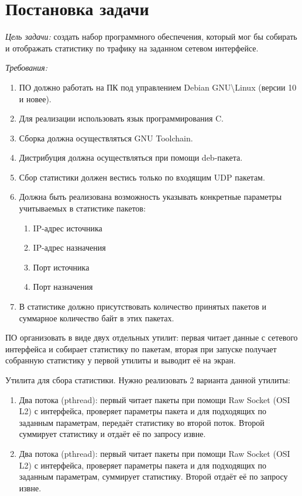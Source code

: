 \section*{Постановка задачи}

\textit{Цель задачи:} создать набор программного обеспечения, который мог бы собирать и отображать статистику по трафику на заданном сетевом интерфейсе.

\linespace

\textit{Требования:}
\begin{enumerate}
    \item ПО должно работать на ПК под управлением Debian GNU\textbackslash Linux (версии 10 и новее).
    \item Для реализации использовать язык программирования C.
    \item Сборка должна осуществляться GNU Toolchain.
    \item Дистрибуция должна осуществляться при помощи deb-пакета.
    \item Сбор статистики должен вестись только по входящим UDP пакетам.
    \item Должна быть реализована возможность указывать конкретные параметры учитываемых в статистике пакетов:
    \begin{enumerate}[wide=\dimexpr\parindent+1.25cm, noitemsep]
        \item IP-адрес источника
        \item IP-адрес назначения
        \item Порт источника
        \item Порт назначения
    \end{enumerate}
    \item В статистике должно присутствовать количество принятых пакетов и суммарное количество байт в этих пакетах.
\end{enumerate}

\linespace

ПО организовать в виде двух отдельных утилит: первая читает данные с сетевого интерфейса и собирает статистику по пакетам, вторая при запуске получает собранную статистику у первой утилиты и выводит её на экран.

\linespace

Утилита для сбора статистики. Нужно реализовать 2 варианта данной утилиты:
\begin{enumerate}
    \item Два потока (pthread): первый читает пакеты при помощи Raw Socket (OSI L2) с интерфейса, проверяет параметры пакета и для подходящих по заданным параметрам, передаёт статистику во второй поток. Второй суммирует статистику и отдаёт её по запросу извне.
    \item Два потока (pthread): первый читает пакеты при помощи Raw Socket (OSI L2) с интерфейса, проверяет параметры пакета и для подходящих по заданным параметрам, суммирует статистику. Второй отдаёт её по запросу извне.
\end{enumerate}

